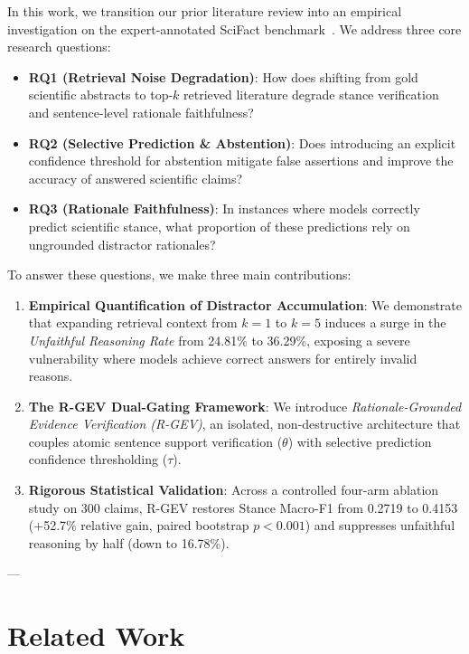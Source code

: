 \documentclass[10pt,journal,compsoc]{IEEEtran}
\begin{document}
In this work, we transition our prior literature review into an empirical investigation on the expert-annotated SciFact benchmark~\cite{wadden2020fact}. We address three core research questions:
\begin{itemize}
    \item \textbf{RQ1 (Retrieval Noise Degradation)}: How does shifting from gold scientific abstracts to top-$k$ retrieved literature degrade stance verification and sentence-level rationale faithfulness?
    \item \textbf{RQ2 (Selective Prediction \& Abstention)}: Does introducing an explicit confidence threshold for abstention mitigate false assertions and improve the accuracy of answered scientific claims?
    \item \textbf{RQ3 (Rationale Faithfulness)}: In instances where models correctly predict scientific stance, what proportion of these predictions rely on ungrounded distractor rationales?
\end{itemize}

To answer these questions, we make three main contributions:
\begin{enumerate}
    \item \textbf{Empirical Quantification of Distractor Accumulation}: We demonstrate that expanding retrieval context from $k=1$ to $k=5$ induces a surge in the \textit{Unfaithful Reasoning Rate} from 24.81\% to 36.29\%, exposing a severe vulnerability where models achieve correct answers for entirely invalid reasons.
    \item \textbf{The R-GEV Dual-Gating Framework}: We introduce \textit{Rationale-Grounded Evidence Verification (R-GEV)}, an isolated, non-destructive architecture that couples atomic sentence support verification ($\theta$) with selective prediction confidence thresholding ($\tau$).
    \item \textbf{Rigorous Statistical Validation}: Across a controlled four-arm ablation study on 300 claims, R-GEV restores Stance Macro-F1 from 0.2719 to 0.4153 (+52.7\% relative gain, paired bootstrap $p < 0.001$) and suppresses unfaithful reasoning by half (down to 16.78\%).
\end{enumerate}

---

\section{Related Work}
\end{document}
